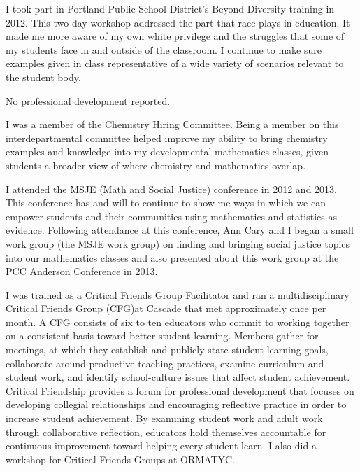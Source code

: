 \begin{description}[style=nextline]
	I took part in Portland Public School District's Beyond Diversity training
	in 2012. This two-day workshop addressed the part that race plays in education.
	It made me more aware of my own white privilege and the struggles that some of
	my students face in and outside of the classroom. I continue to make sure
	examples given in class representative of a wide variety of scenarios relevant
	to the student body.

	\item[Phil Thurber (Full-time Instructor, Sylvania Campus)]

	No professional development reported.

	\item[Emiliano Vega (Full Time Instructor, Sylvania Camps)]
	I was a member of the Chemistry Hiring Committee. Being a member on this
	interdepartmental committee helped improve my ability to bring chemistry
	examples and knowledge into my developmental mathematics classes, given
	students a broader view of where chemistry and mathematics overlap.

	I attended the MSJE (Math and Social Justice) conference in 2012 and 2013. This
	conference has and will to continue to show me ways in which we can empower
	students and their communities using mathematics and statistics as evidence.
	Following attendance at this conference, Ann Cary and I began a small work
	group (the MSJE work group) on finding and bringing social justice topics into
	our mathematics classes and also presented about this work group at the PCC
	Anderson Conference in 2013.

	\item[Carly Vollet (Full-time Instructor, Cascade Campus)]
	I was trained as a Critical Friends Group Facilitator and ran a
	multidisciplinary Critical Friends Group (CFG)at Cascade that met approximately
	once per month. A CFG consists of six to ten educators who commit to working
	together on a consistent basis toward better student learning. Members gather
	for meetings, at which they establish and publicly state student learning
	goals, collaborate around productive teaching practices, examine curriculum and
	student work, and identify school-culture issues that affect student
	achievement. Critical Friendship provides a forum for professional development
	that focuses on developing collegial relationships and encouraging reflective
	practice in order to increase student achievement.  By examining student work
	and adult work through collaborative reflection, educators hold themselves
	accountable for continuous improvement toward helping every student learn.  I
	also did a workshop for Critical Friends Groups at ORMATYC.


\end{description}
